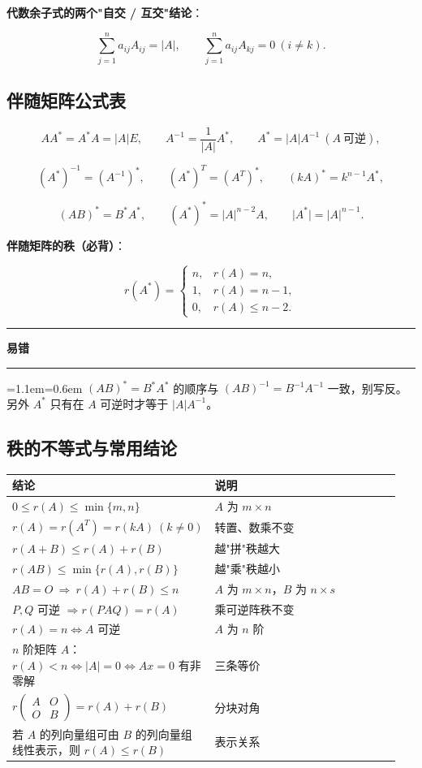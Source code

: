 \documentclass[11pt,openany,UTF8]{ctexbook}
\newcommand{\callouthead}[2]{%
  \par\addvspace{7pt}\noindent
  {\color{#1}\rule[-0.15em]{3pt}{1.05em}}\hspace{0.5em}%
  {\bfseries\color{#1}#2}\par\nobreak\vspace{-0.35em}%
  {\color{rulesep}\hrule height 0.4pt}\nobreak\vspace{0.45em}%
  \begingroup\small\setlength{\parindent}{0pt}%
  \leftskip=1.1em\rightskip=0.6em\noindent\ignorespaces}
\newcommand{\calloutend}{\par\endgroup\addvspace{7pt}}
\newenvironment{callwarn}[1]{\callouthead{warnbar}{#1}}{\calloutend}
\begin{document}
\textbf{代数余子式的两个"自交 / 互交"结论}：

\[\sum_{j=1}^{n}a_{ij}A_{ij}=\lvert A\rvert,\qquad \sum_{j=1}^{n}a_{ij}A_{kj}=0\ (i\ne k).\]

\subsection{伴随矩阵公式表}

\[AA^*=A^*A=\lvert A\rvert E,\qquad A^{-1}=\frac{1}{\lvert A\rvert}A^*,\qquad A^*=\lvert A\rvert A^{-1}\ (A\ \text{可逆}),\]

\[(A^*)^{-1}=(A^{-1})^*,\qquad (A^*)^T=(A^T)^*,\qquad (kA)^*=k^{n-1}A^*,\]

\[(AB)^*=B^*A^*,\qquad (A^*)^*=\lvert A\rvert^{n-2}A,\qquad \lvert A^*\rvert=\lvert A\rvert^{n-1}.\]

\textbf{伴随矩阵的秩（必背）}：

\[r(A^*)=\begin{cases}n,& r(A)=n,\\ 1,& r(A)=n-1,\\ 0,& r(A)\le n-2.\end{cases}\]

\begin{callwarn}{易错}
$(AB)^*=B^*A^*$ 的顺序与 $(AB)^{-1}=B^{-1}A^{-1}$ 一致，别写反。 另外 $A^*$ 只有在 $A$ 可逆时才等于 $\lvert A\rvert A^{-1}$。

\end{callwarn}

\subsection{秩的不等式与常用结论}

\begingroup\small\setlength{\tabcolsep}{4.0pt}
\begin{longtable}{@{}L{0.4272\linewidth}L{0.5185\linewidth}@{}}
\toprule
\textbf{结论} & \textbf{说明} \\
\midrule
\endhead
$0\le r(A)\le\min\{m,n\}$ & $A$ 为 $m\times n$ \\
$r(A)=r(A^T)=r(kA)\allowbreak\ (k\ne0)$ & 转置、数乘不变 \\
$r(A+B)\le r(A)+r(B)$ & 越"拼"秩越大 \\
$r(AB)\le\min\{r(A),r(B)\}$ & 越"乘"秩越小 \\
$AB=O\allowbreak\ \Rightarrow\allowbreak\ r(A)+r(B)\le n$ & $A$ 为 $m\times n$，$B$ 为 $n\times s$ \\
$P,Q$ 可逆 $\Rightarrow r(PAQ)=r(A)$ & 乘可逆阵秩不变 \\
$r(A)=n\iff A$ 可逆 & $A$ 为 $n$ 阶 \\
$n$ 阶矩阵 $A$：$r(A)<n\iff\lvert A\rvert=0\iff Ax=0$ 有非零解 & 三条等价 \\
$r\begin{pmatrix}A&O\\O&B\end{pmatrix}=r(A)+r(B)$ & 分块对角 \\
若 $A$ 的列向量组可由 $B$ 的列向量组线性表示，则 $r(A)\le r(B)$ & 表示关系 \\
\bottomrule
\end{longtable}
\endgroup
\end{document}
